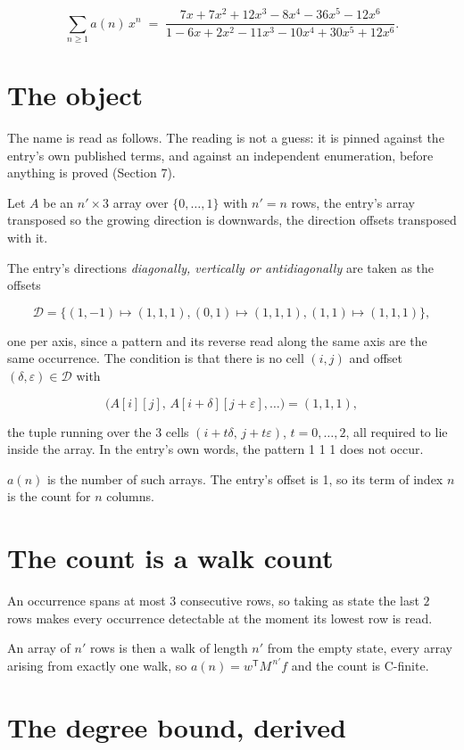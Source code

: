 \documentclass[11pt]{article}
\theoremstyle{definition}
\begin{document}
\[\sum_{n \ge 1} a(n)\,x^n \;=\; \frac{7x + 7x^{2} + 12x^{3} - 8x^{4} - 36x^{5} - 12x^{6}}{1 - 6x + 2x^{2} - 11x^{3} - 10x^{4} + 30x^{5} + 12x^{6}}.\]

\section{The object}

The name is read as follows. The reading is not a guess: it is pinned against the entry's own published terms, and against an independent enumeration, before anything is proved (Section 7).

Let $A$ be an $n' \times 3$ array over $\{0,\dots,1\}$ with $n' = n$ rows, the entry's array transposed so the growing direction is downwards, the direction offsets transposed with it.

The entry's directions {\itshape diagonally, vertically or antidiagonally} are taken as the offsets

\[\mathcal{D} = \{(1,-1)\mapsto(1,1,1), (0,1)\mapsto(1,1,1), (1,1)\mapsto(1,1,1)\},\]

one per axis, since a pattern and its reverse read along the same axis are the same occurrence. The condition is that there is no cell $(i,j)$ and offset $(\delta,\varepsilon)\in\mathcal{D}$ with

\[\bigl(A[i][j],\,A[i{+}\delta][j{+}\varepsilon],\dots\bigr) = (1, 1, 1),\]

the tuple running over the $3$ cells $(i+t\delta,\,j+t\varepsilon)$, $t = 0,\dots,2$, all required to lie inside the array. In the entry's own words, the pattern 1 1 1 does not occur.

$a(n)$ is the number of such arrays. The entry's offset is 1, so its term of index $n$ is the count for $n$ columns.

\section{The count is a walk count}

An occurrence spans at most $3$ consecutive rows, so taking as state the last $2$ rows makes every occurrence detectable at the moment its lowest row is read.

An array of $n'$ rows is then a walk of length $n'$ from the empty state, every array arising from exactly one walk, so $a(n) = w^{\mathsf T}M^{\,n'}f$ and the count is C-finite.

\section{The degree bound, derived}
\end{document}
